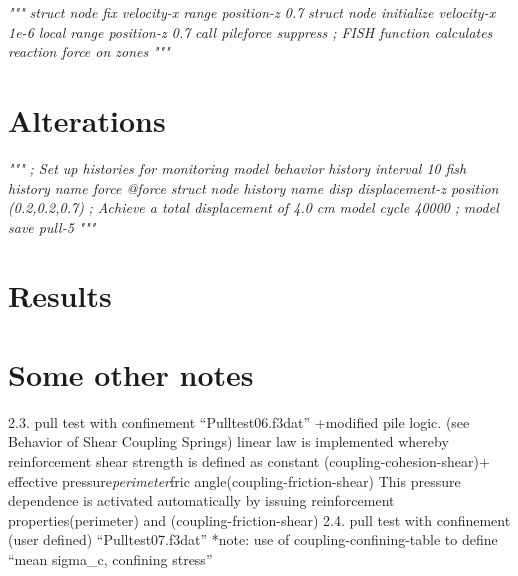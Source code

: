 \documentclass[a4paper, nobind]{templates/ociamthesis}
\newenvironment{Shaded}{\begin{snugshade}}{\end{snugshade}}
\newcommand{\CommentTok}[1]{\textcolor[rgb]{0.56,0.35,0.01}{\textit{#1}}}
\renewenvironment{Shaded}
{
  \vspace{10pt}%
  \begin{snugshade}%
}{%
  \end{snugshade}%
  \vspace{8pt}%
}
\begin{document}
\begin{Shaded}
\begin{Highlighting}[]
\CommentTok{"""}
\CommentTok{struct node fix velocity{-}x range position{-}z 0.7}
\CommentTok{struct node initialize velocity{-}x 1e{-}6 local range position{-}z 0.7}
\CommentTok{call \textquotesingle{}pileforce\textquotesingle{} suppress ; FISH function calculates reaction force on zones}
\CommentTok{"""}
\end{Highlighting}
\end{Shaded}

\hypertarget{alterations-2}{%
\section{Alterations}\label{alterations-2}}

\begin{Shaded}
\begin{Highlighting}[]
\CommentTok{"""}
\CommentTok{; Set up histories for monitoring model behavior}
\CommentTok{history interval 10}
\CommentTok{fish history name \textquotesingle{}force\textquotesingle{} @force}
\CommentTok{struct node history name \textquotesingle{}disp\textquotesingle{} displacement{-}z position (0.2,0.2,0.7)}
\CommentTok{; Achieve a total displacement of 4.0 cm}
\CommentTok{model cycle 40000}
\CommentTok{;}
\CommentTok{model save \textquotesingle{}pull{-}5\textquotesingle{}}
\CommentTok{"""}
\end{Highlighting}
\end{Shaded}

\hypertarget{results-2}{%
\section{Results}\label{results-2}}

\hypertarget{some-other-notes}{%
\section{Some other notes}\label{some-other-notes}}

2.3. pull test with confinement ``Pulltest06.f3dat''
+modified pile logic.
(see Behavior of Shear Coupling Springs) linear law is implemented
whereby reinforcement shear strength is defined as constant
(coupling-cohesion-shear)+ effective pressure\emph{perimeter}fric angle(coupling-friction-shear)
This pressure dependence is activated automatically by issuing
reinforcement properties(perimeter) and (coupling-friction-shear)
2.4. pull test with confinement (user defined) ``Pulltest07.f3dat''
*note: use of coupling-confining-table to define ``mean sigma\_c, confining stress''
\end{document}
